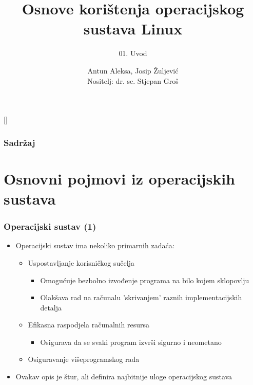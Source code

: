 \documentclass{beamer}
\title{Osnove korištenja operacijskog sustava Linux}
\subtitle{01. Uvod}
\author[Antun Aleksa, Josip Žuljević]{Antun Aleksa, Josip Žuljević\\{\small Nositelj: dr. sc. Stjepan Groš}}
\institute[FER]{Sveučilište u Zagrebu \\
				Fakultet elektrotehnike i računarstva}
\date{\todayiso}
\begin{document}
{
[] %

\begin{frame}
\maketitle
\end{frame}
}

\begin{frame}
\frametitle{Sadržaj}
\tableofcontents
\end{frame}

\section{Osnovni pojmovi iz operacijskih sustava}
\begin{frame}[t]
\frametitle{Operacijski sustav (1)}
\begin{itemize}
	\item Operacijski sustav ima nekoliko primarnih zadaća:
  \begin{itemize}
    \item Uspostavljanje korisničkog sučelja
    \begin{itemize}
      \item Omogućuje bezbolno izvođenje programa na bilo kojem sklopovlju
      \item Olakšava rad na računalu 'skrivanjem' raznih implementacijskih detalja
    \end{itemize}
    \item Efikasna raspodjela računalnih resursa
    \begin{itemize}
      \item Osigurava da se svaki program izvrši sigurno i neometano
    \end{itemize}
    \item Osiguravanje višeprogramskog rada
	\end{itemize}
  \item Ovakav opis je štur, ali definira najbitnije uloge
        operacijskog sustava 
\end{itemize}
\end{frame}
\end{document}

